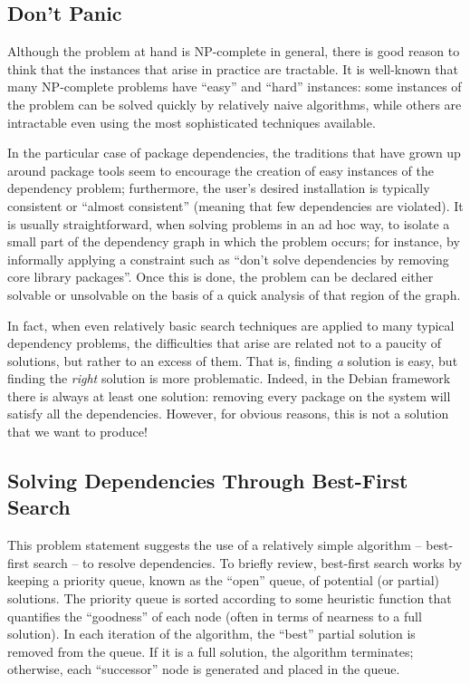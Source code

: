 \documentclass[letterpaper]{article}
\theoremstyle{definition}
\theoremstyle{remark}
\begin{document}
\subsection{Don't Panic}

Although the problem at hand is NP-complete in general, there is good
reason to think that the instances that arise in practice are
tractable.  It is well-known that many NP-complete problems have
``easy'' and ``hard'' instances: some instances of the problem can be
solved quickly by relatively naive algorithms, while others are
intractable even using the most sophisticated techniques available.

In the particular case of package dependencies, the traditions that
have grown up around package tools seem to encourage the creation of
easy instances of the dependency problem; furthermore, the user's
desired installation is typically consistent or ``almost consistent''
(meaning that few dependencies are violated).  It is usually
straightforward, when solving problems in an ad hoc way, to isolate a
small part of the dependency graph in which the problem occurs; for
instance, by informally applying a constraint such as ``don't solve
dependencies by removing core library packages''.  Once this is done,
the problem can be declared either solvable or unsolvable on the basis
of a quick analysis of that region of the graph.

In fact, when even relatively basic search techniques are applied to
many typical dependency problems, the difficulties that arise are
related not to a paucity of solutions, but rather to an excess of
them.  That is, finding \emph{a} solution is easy, but finding the
\emph{right} solution is more problematic.  Indeed, in the Debian
framework there is always at least one solution: removing every
package on the system will satisfy all the dependencies.  However, for
obvious reasons, this is not a solution that we want to produce!

\subsection{Solving Dependencies Through Best-First Search}

This problem statement suggests the use of a relatively simple
algorithm -- best-first search -- to resolve dependencies.  To briefly
review, best-first search works by keeping a priority queue, known as
the ``open'' queue, of potential (or partial) solutions.  The priority
queue is sorted according to some heuristic function that quantifies
the ``goodness'' of each node (often in terms of nearness to a full
solution).  In each iteration of the algorithm, the ``best'' partial
solution is removed from the queue.  If it is a full solution, the
algorithm terminates; otherwise, each ``successor'' node is generated
and placed in the queue.
\end{document}
